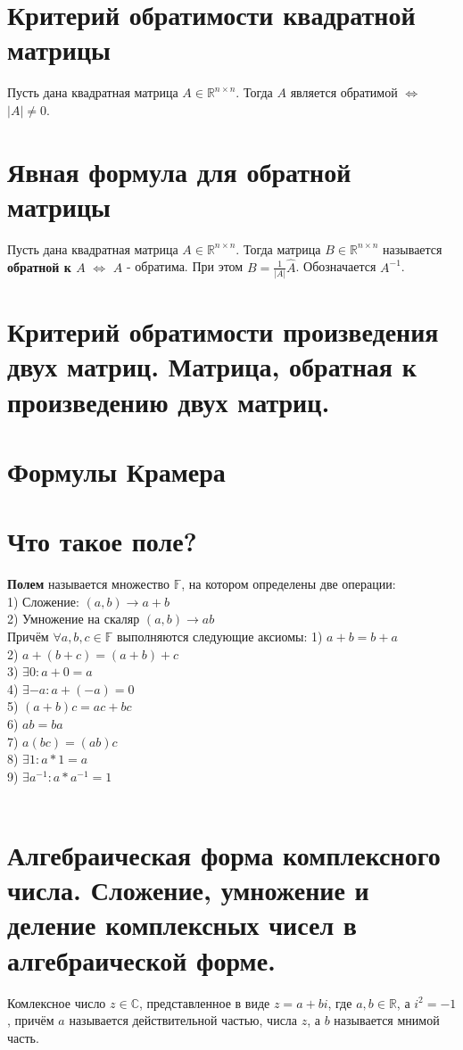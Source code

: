 \documentclass[a4paper,11pt]{report}
\begin{document}
\section{Критерий обратимости квадратной матрицы}
Пусть дана квадратная матрица $A \in \mathbb{R}^{n\times{n}}$. Тогда $A$ является обратимой $\Leftrightarrow$ $|A| \neq 0$.
\section{Явная формула для обратной матрицы}
Пусть дана квадратная матрица $A \in \mathbb{R}^{n\times{n}}$. Тогда матрица $B \in \mathbb{R}^{n\times{n}}$ называется
\textbf{обратной к $A$} $\Leftrightarrow$ $A$ - обратима. При этом $B = \frac{1}{|A|}\hat{A}$. Обозначается $A^{-1}$.
\section{Критерий обратимости произведения двух матриц. Матрица, обратная к произведению двух матриц.}
\section{Формулы Крамера}
\section{Что такое поле?}
\textbf{Полем} называется множество $\mathbb{F}$, на котором определены две операции:\\
1) Сложение: $(a, b) \longrightarrow a + b$\\
2) Умножение на скаляр $(a, b) \longrightarrow ab$\\
Причём $\forall a, b, c \in \mathbb{F}$ выполняются следующие аксиомы:
1) $a + b = b + a$\\
2) $a + (b + c) = (a + b) + c$\\
3) $\exists 0: a + 0 = a$\\
4) $\exists -a: a + (-a) = 0$\\
5) $(a + b)c = ac + bc$\\
6) $ab = ba$\\
7) $a(bc) = (ab)c$\\
8) $\exists 1: a * 1 = a$\\
9) $\exists a^{-1}: a * a^{-1} = 1$\\
\\
\section{Алгебраическая форма комплексного числа. Сложение, умножение и деление комплексных чисел в алгебраической форме.}
Комлексное число $z \in \mathbb{C}$, представленное в виде $z = a + bi$, где $a, b \in \mathbb{R}$, а $i^2 = -1$,
причём $a$ называется действительной частью, числа $z$, а $b$ называется мнимой часть.\\
\end{document}
